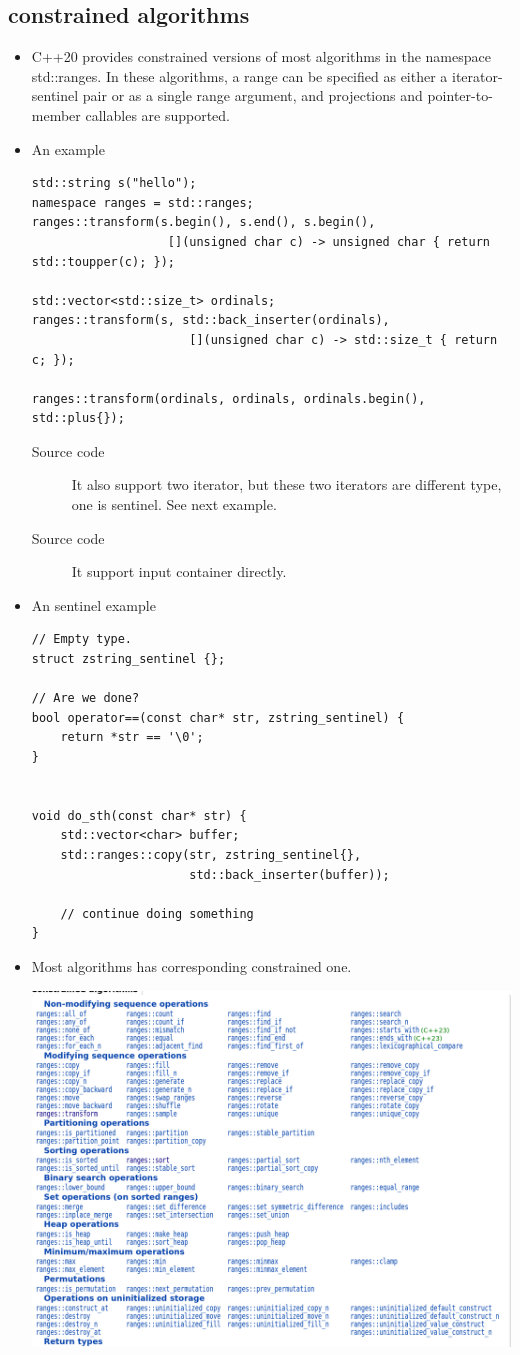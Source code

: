 \documentclass[a4paper,11pt,twoside]{book}
\begin{document}
\subsection{constrained algorithms}
\begin{itemize}
		\item C++20 provides constrained versions of most algorithms in the namespace std::ranges. In these algorithms, a range can be specified as either a iterator-sentinel pair or as a single range argument, and projections and pointer-to-member callables are supported. 
		\item An example
\begin{lstlisting}
std::string s("hello");
namespace ranges = std::ranges;
ranges::transform(s.begin(), s.end(), s.begin(),
                   [](unsigned char c) -> unsigned char { return std::toupper(c); });
 
std::vector<std::size_t> ordinals;
ranges::transform(s, std::back_inserter(ordinals),
                      [](unsigned char c) -> std::size_t { return c; });
 
ranges::transform(ordinals, ordinals, ordinals.begin(), std::plus{});
\end{lstlisting}
\begin{description}
		\item[Source code] It also support two iterator, but these two iterators are different type, one is sentinel. See next example.
		\item[Source code] It support input container directly.
\end{description}
		\item An sentinel example
\begin{lstlisting}
// Empty type.
struct zstring_sentinel {};

// Are we done?
bool operator==(const char* str, zstring_sentinel) {
    return *str == '\0';
}


void do_sth(const char* str) {
    std::vector<char> buffer;
    std::ranges::copy(str, zstring_sentinel{},
                      std::back_inserter(buffer));

    // continue doing something
}
\end{lstlisting}
\item Most algorithms has corresponding constrained one.

\includegraphics[width=0.85\linewidth]{pics/ca.png}

\end{itemize}
\end{document}
